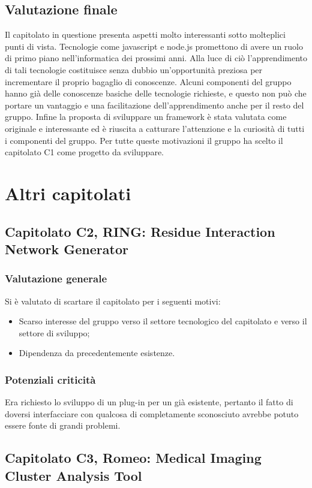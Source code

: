 \subsection{Valutazione finale}
\label{2.5}
Il capitolato in questione presenta aspetti molto interessanti sotto molteplici punti di vista. Tecnologie come javascript e node.js promettono di avere un ruolo di primo piano nell'informatica dei prossimi anni. Alla luce di ciò l'apprendimento di tali tecnologie costituisce senza dubbio un'opportunità preziosa per incrementare il proprio bagaglio di conoscenze. Alcuni componenti del gruppo hanno già delle conoscenze basiche delle tecnologie richieste, e questo non può che portare un vantaggio e una facilitazione dell'apprendimento anche per il resto del gruppo. Infine la proposta di sviluppare un framework è stata valutata come originale e interessante ed è riuscita a catturare l'attenzione e la curiosità di tutti i componenti del gruppo. Per tutte queste motivazioni il gruppo ha scelto il capitolato C1 come progetto da sviluppare.

\newpage
\section{Altri capitolati}%
\label{3}
\subsection{Capitolato C2, RING: Residue Interaction Network Generator}
\label{3.1}
\subsubsection{Valutazione generale}
Si è valutato di scartare il capitolato per i seguenti motivi:
\begin{itemize}
\item Scarso interesse del gruppo verso il settore tecnologico del capitolato e verso il settore di sviluppo;
\item Dipendenza da  precedentemente esistenze.
\end{itemize}
\subsubsection{Potenziali criticità}
Era richiesto lo sviluppo di un plug-in per un  già esistente, pertanto il fatto di doversi interfacciare con qualcosa di completamente sconosciuto avrebbe potuto essere fonte di grandi problemi.
\subsection{Capitolato C3,  Romeo: Medical Imaging Cluster Analysis Tool}
\label{3.2}
